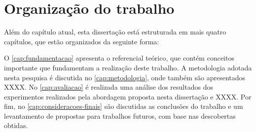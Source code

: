 \section{Organização do trabalho}
\label{sec:introducao-organizacao-trabalho}

Além do capítulo atual, esta dissertação está estruturada em mais quatro capítulos, que estão organizados da seguinte forma:

O \autoref{cap:fundamentacao} apresenta o referencial teórico, que contém conceitos importante que fundamentam a realização deste trabalho. 
A metodologia adotada nesta pesquisa é discutida no \autoref{cap:metodologia}, onde também são apresentados XXXX. %
No \autoref{cap:avaliacao} é realizada uma análise dos resultados dos experimentos realizados pela abordagem proposta nesta dissertação e XXXX. %
Por fim, no \autoref{cap:consideracoes-finais} são discutidas as conclusões do trabalho e um levantamento de propostas para trabalhos futuros, com base nas descobertas obtidas.

